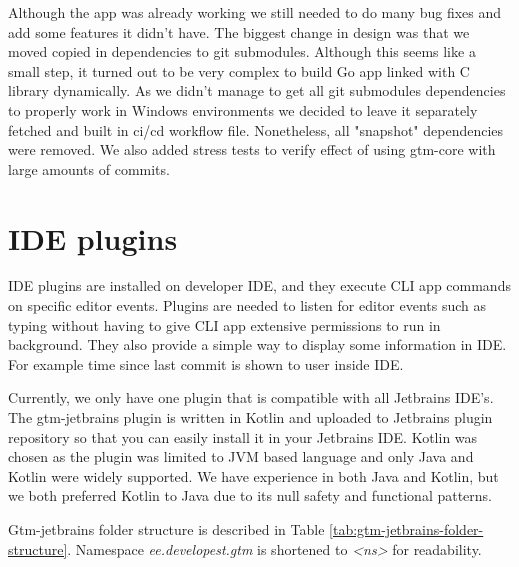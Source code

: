 Although the app was already working we still needed to do many bug fixes and add some features it didn't have.
The biggest change in design was that we moved copied in dependencies to git submodules.
Although this seems like a small step, it turned out to be very complex to build Go app linked with C library dynamically.
As we didn't manage to get all git submodules dependencies to properly work in Windows environments
we decided to leave it separately fetched and built in ci/cd workflow file.
Nonetheless, all "snapshot" dependencies were removed.
We also added stress tests to verify effect of using gtm-core with large amounts of commits.

\section{IDE plugins}\label{sec:ide-plugins}
IDE plugins are installed on developer IDE, and they execute CLI app commands on specific editor events.
Plugins are needed to listen for editor events such as typing without having to give CLI app extensive permissions to run in background.
They also provide a simple way to display some information in IDE.
For example time since last commit is shown to user inside IDE.

Currently, we only have one plugin that is compatible with all Jetbrains IDE's.
The gtm-jetbrains plugin is written in Kotlin and uploaded to Jetbrains plugin repository so that you can easily install it in your Jetbrains IDE.
Kotlin was chosen as the plugin was limited to JVM based language and only Java and Kotlin were widely supported.
We have experience in both Java and Kotlin, but we both preferred Kotlin to Java due to its null safety and functional patterns.

Gtm-jetbrains folder structure is described in Table
\ref{tab:gtm-jetbrains-folder-structure}.
Namespace \textit{ee.developest.gtm} is shortened to \textit{<ns>} for readability.

